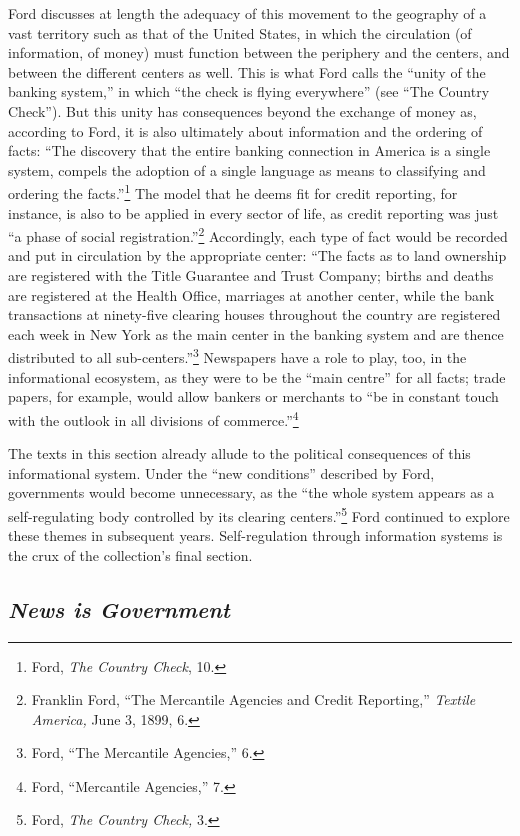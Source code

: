 \documentclass[twoside,symmetric,nobib,justified]{tufte-book}
\begin{document}
Ford discusses at length the adequacy of this movement to the geography
of a vast territory such as that of the United States, in which the
circulation (of information, of money) must function between the
periphery and the centers, and between the different centers as well.
This is what Ford calls the ``unity of the banking system,'' in which
``the check is flying everywhere'' (see ``The Country Check''). But this
unity has consequences beyond the exchange of money as, according to
Ford, it is also ultimately about information and the ordering of facts:
``The discovery that the entire banking connection in America is a
single system, compels the adoption of a single language as means to
classifying and ordering the facts.''\footnote{Ford, \emph{The Country
  Check}, 10.} The model that he deems fit for credit reporting, for
instance, is also to be applied in every sector of life, as credit
reporting was just ``a phase of social registration.''\footnote{Franklin
  Ford, ``The Mercantile Agencies and Credit Reporting,'' \emph{Textile
  America,} June 3, 1899, 6.} Accordingly, each type of fact would be
recorded and put in circulation by the appropriate center: ``The facts
as to land ownership are registered with the Title Guarantee and Trust
Company; births and deaths are registered at the Health Office,
marriages at another center, while the bank transactions at ninety-five
clearing houses throughout the country are registered each week in New
York as the main center in the banking system and are thence distributed
to all sub-centers.''\footnote{Ford, ``The Mercantile Agencies,'' 6.}
Newspapers have a role to play, too, in the informational ecosystem, as
they were to be the ``main centre'' for all facts; trade papers, for
example, would allow bankers or merchants to ``be in constant touch with
the outlook in all divisions of commerce.''\footnote{Ford, ``Mercantile
  Agencies,'' 7.}

The texts in this section already allude to the political consequences
of this informational system. Under the ``new conditions'' described by
Ford, governments would become unnecessary, as the ``the whole system
appears as a self-regulating body controlled by its clearing
centers.''\footnote{Ford, \emph{The Country Check,} 3.} Ford continued
to explore these themes in subsequent years. Self-regulation through
information systems is the crux of the collection's final section.

\hypertarget{news-is-government}{%
\subsection{\texorpdfstring{\emph{News is
Government}}{News is Government}}\label{news-is-government}}
\end{document}
